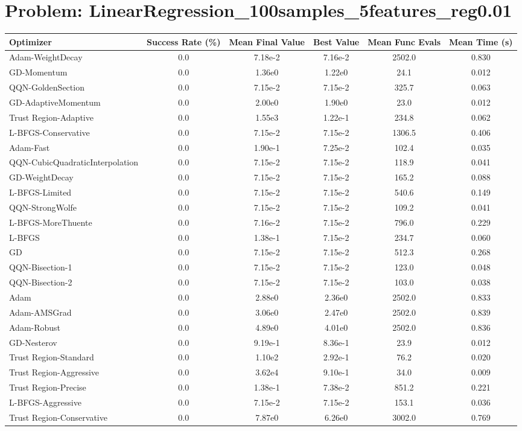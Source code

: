 \documentclass{article}
\begin{document}
\section{Problem: LinearRegression\_100samples\_5features\_reg0.01}
\begin{longtable}{p{3cm}*{5}{c}}
\toprule
\textbf{Optimizer} & \textbf{Success Rate (\%)} & \textbf{Mean Final Value} & \textbf{Best Value} & \textbf{Mean Func Evals} & \textbf{Mean Time (s)} \\
\midrule
Adam-WeightDecay & 0.0 & 7.18e-2 & 7.16e-2 & 2502.0 & 0.830 \\
GD-Momentum & 0.0 & 1.36e0 & 1.22e0 & 24.1 & 0.012 \\
QQN-GoldenSection & 0.0 & 7.15e-2 & 7.15e-2 & 325.7 & 0.063 \\
GD-AdaptiveMomentum & 0.0 & 2.00e0 & 1.90e0 & 23.0 & 0.012 \\
Trust Region-Adaptive & 0.0 & 1.55e3 & 1.22e-1 & 234.8 & 0.062 \\
L-BFGS-Conservative & 0.0 & 7.15e-2 & 7.15e-2 & 1306.5 & 0.406 \\
Adam-Fast & 0.0 & 1.90e-1 & 7.25e-2 & 102.4 & 0.035 \\
QQN-CubicQuadraticInterpolation & 0.0 & 7.15e-2 & 7.15e-2 & 118.9 & 0.041 \\
GD-WeightDecay & 0.0 & 7.15e-2 & 7.15e-2 & 165.2 & 0.088 \\
L-BFGS-Limited & 0.0 & 7.15e-2 & 7.15e-2 & 540.6 & 0.149 \\
QQN-StrongWolfe & 0.0 & 7.15e-2 & 7.15e-2 & 109.2 & 0.041 \\
L-BFGS-MoreThuente & 0.0 & 7.16e-2 & 7.15e-2 & 796.0 & 0.229 \\
L-BFGS & 0.0 & 1.38e-1 & 7.15e-2 & 234.7 & 0.060 \\
GD & 0.0 & 7.15e-2 & 7.15e-2 & 512.3 & 0.268 \\
QQN-Bisection-1 & 0.0 & 7.15e-2 & 7.15e-2 & 123.0 & 0.048 \\
QQN-Bisection-2 & 0.0 & 7.15e-2 & 7.15e-2 & 103.0 & 0.038 \\
Adam & 0.0 & 2.88e0 & 2.36e0 & 2502.0 & 0.833 \\
Adam-AMSGrad & 0.0 & 3.06e0 & 2.47e0 & 2502.0 & 0.839 \\
Adam-Robust & 0.0 & 4.89e0 & 4.01e0 & 2502.0 & 0.836 \\
GD-Nesterov & 0.0 & 9.19e-1 & 8.36e-1 & 23.9 & 0.012 \\
Trust Region-Standard & 0.0 & 1.10e2 & 2.92e-1 & 76.2 & 0.020 \\
Trust Region-Aggressive & 0.0 & 3.62e4 & 9.10e-1 & 34.0 & 0.009 \\
Trust Region-Precise & 0.0 & 1.38e-1 & 7.38e-2 & 851.2 & 0.221 \\
L-BFGS-Aggressive & 0.0 & 7.15e-2 & 7.15e-2 & 153.1 & 0.036 \\
Trust Region-Conservative & 0.0 & 7.87e0 & 6.26e0 & 3002.0 & 0.769 \\
\bottomrule
\end{longtable}
\end{document}

